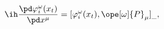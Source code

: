 \begin{equation}	\label{12.96}
\ih \frac{\pd\varphi_i^\omega(x_t)}{\pd x^\mu}
=
[ \varphi_i^\omega(x_t) ,
\ope[\omega]{P}_{\mu} ]_{\_} ,
	\end{equation}

